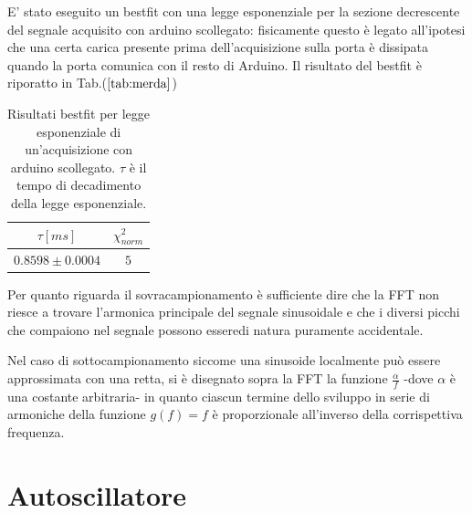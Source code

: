 \documentclass{article}
\begin{document}
    E' stato eseguito un bestfit con una legge esponenziale per la sezione decrescente
    del segnale acquisito con arduino scollegato: fisicamente questo è legato all'ipotesi 
    che una certa carica presente prima dell'acquisizione 
    sulla porta è dissipata quando la porta comunica con il resto di Arduino.
    Il risultato del bestfit è riporatto in Tab.($\ref{tab:merda}$)

        \begin{table}[H]
            \centering
            \begin{tabular}{cc}
                $\tau[ms]$ & $\chi^2_{norm}$\\
                \hline
                $0.8598\pm0.0004$ &$5$\\
            \end{tabular}
        \caption{Risultati bestfit per legge esponenziale di un'acquisizione 
                con arduino scollegato. $\tau$ è il tempo di decadimento della legge 
                esponenziale.}
        \label{tab:merda}
        \end{table}



    Per quanto riguarda il sovracampionamento è sufficiente dire che la 
    FFT non riesce a trovare l'armonica principale del segnale sinusoidale e 
    che i diversi picchi che compaiono nel segnale possono esseredi natura puramente
    accidentale.

    Nel caso di sottocampionamento siccome una sinusoide localmente può 
    essere approssimata con una retta, si è disegnato sopra la FFT la funzione
    $\frac{\alpha}{f}$ -dove $\alpha$ è una costante arbitraria-
    in quanto ciascun termine dello sviluppo in serie  di 
    armoniche della funzione $g(f)=f$ è proporzionale all'inverso della 
    corrispettiva frequenza.







\section{Autoscillatore}
\end{document}
